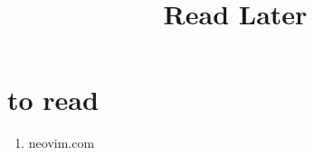 \documentclass{article}
\title {Read Later}
\begin{document}
\maketitle

\section{to read}

\begin{enumerate}

\item neovim.com

\end{enumerate}
\end{document}

